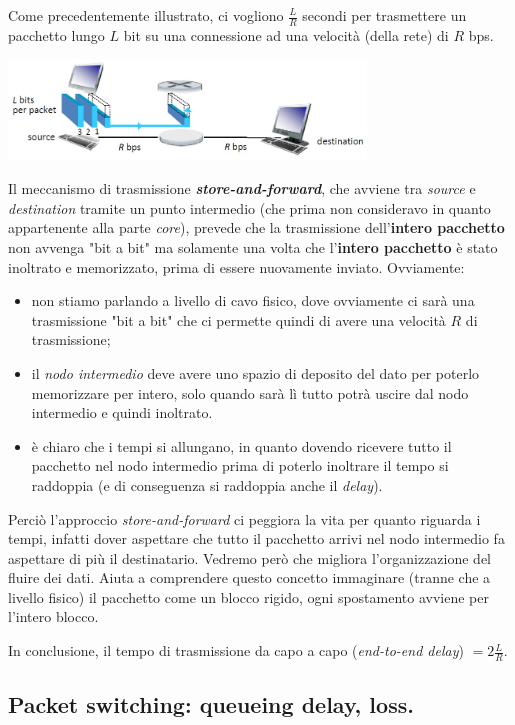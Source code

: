 \documentclass[10pt, a4paper, openany]{book}
\begin{document}
\noindent Come precedentemente illustrato, ci vogliono $\frac{L}{R}$ secondi per trasmettere un pacchetto lungo $L$ bit su una connessione ad una velocità (della rete) di  $R$ bps.
\begin{center}
    \includegraphics[width=95mm]{cap1 - Introduzione alle reti - 9.jpg}
\end{center}
\noindent Il meccanismo di trasmissione \textit{\textbf{store-and-forward}}, che avviene tra \textit{source} e \textit{destination} tramite un punto intermedio (che prima non consideravo in quanto appartenente alla parte \textit{core}), prevede che la trasmissione dell'\textbf{intero pacchetto} non avvenga "bit a bit" ma solamente una volta che l'\textbf{intero pacchetto} è stato inoltrato e memorizzato, prima di essere nuovamente inviato. Ovviamente:
\begin{itemize}
    \item non stiamo parlando a livello di cavo fisico, dove ovviamente ci sarà una trasmissione "bit a bit" che ci permette quindi di avere una velocità $R$ di trasmissione;
    \item il \textit{nodo intermedio} deve avere uno spazio di deposito del dato per poterlo memorizzare per intero, solo quando sarà lì tutto potrà uscire dal nodo intermedio e quindi inoltrato.
    \item è chiaro che i tempi si allungano, in quanto dovendo ricevere tutto il pacchetto nel nodo intermedio prima di poterlo inoltrare il tempo si raddoppia (e di conseguenza si raddoppia anche il \textit{delay}).
\end{itemize}
\noindent Perciò l'approccio \textit{store-and-forward} ci peggiora la vita per quanto riguarda i tempi, infatti dover aspettare che tutto il pacchetto arrivi nel nodo intermedio fa aspettare di più il destinatario. Vedremo però che migliora l'organizzazione del fluire dei dati. Aiuta a comprendere questo concetto immaginare (tranne che a livello fisico) il pacchetto come un blocco rigido, ogni spostamento avviene per l'intero blocco.

\noindent In conclusione, il tempo di trasmissione da capo a capo (\textit{end-to-end delay}) $= 2\frac{L}{R}$.

\subsection{Packet switching: queueing delay, loss.}
\end{document}
